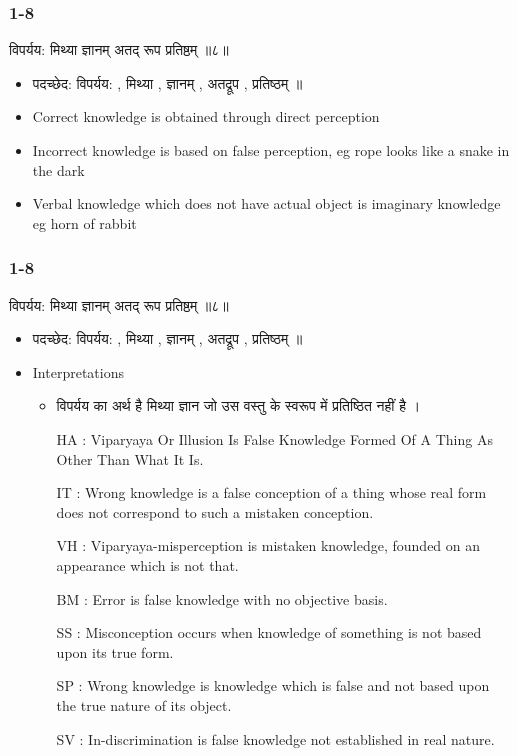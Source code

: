 \begin{frame}[fragile]\frametitle{1-8}

\begin{sanskrit}
विपर्यय: मिथ्या ज्ञानम् अतद् रूप प्रतिष्ठम् ॥८॥
\end{sanskrit}


	\begin{itemize}
	\item पदच्छेद: विपर्यय: , मिथ्या , ज्ञानम् , अतद्रूप , प्रतिष्ठम् ॥
	\item Correct knowledge is obtained through direct perception
	\item Incorrect knowledge is based on false perception, eg rope looks like a snake in the dark
	\item Verbal knowledge which does not have actual object is imaginary knowledge eg horn of rabbit
	\end{itemize}

\end{frame}

\begin{frame}[fragile]\frametitle{1-8}

\begin{sanskrit}
विपर्यय: मिथ्या ज्ञानम् अतद् रूप प्रतिष्ठम् ॥८॥
\end{sanskrit}


	\begin{itemize}
	\item पदच्छेद: विपर्यय: , मिथ्या , ज्ञानम् , अतद्रूप , प्रतिष्ठम् ॥
	\item Interpretations
		\begin{itemize}		
		\item विपर्यय का अर्थ है मिथ्या ज्ञान जो उस वस्तु के स्वरूप में प्रतिष्ठित नहीं है ।
		\item [HA]: Viparyaya Or Illusion Is False Knowledge Formed Of A Thing As Other Than What It Is.
		\item [IT]: Wrong knowledge is a false conception of a thing whose real form does not correspond to such a mistaken conception.
		\item [VH]: Viparyaya-misperception is mistaken knowledge, founded on an appearance which is not that.
		\item [BM]: Error is false knowledge with no objective basis.
		\item [SS]: Misconception occurs when knowledge of something is not based upon its true form.
		\item [SP]: Wrong knowledge is knowledge which is false and not based upon the true nature of its object.
		\item [SV]: In-discrimination is false knowledge not established in real nature.
		\end{itemize}
	\end{itemize}

\end{frame}

